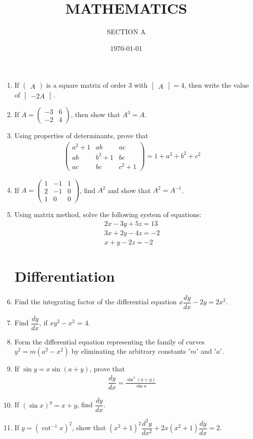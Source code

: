 \documentclass[10pt,-letter paper]{article}
\title{MATHEMATICS}
\author{SECTION A}
\date{\today}
\providecommand{\brak}[1]{\ensuremath{\left(#1\right)}}
\newcommand{\myvec}[1]{\ensuremath{\begin{pmatrix}#1\end{pmatrix}}}
\newcommand{\mydet}[1]{\ensuremath{\begin{vmatrix}#1\end{vmatrix}}}
\begin{document}
\maketitle

\begin{enumerate}
\section{Matrix}
\item If \myvec{A} is a square matrix of order $3$ with $\mydet{A} = 4$, then write the value of $\mydet{-2A}$.
\item If $A=\myvec{ -3 & 6 \\ -2 & 4}$, then show that ${A}^3=A$.
\item Using properties of determinants, prove that
	\begin{align*}
\myvec{{a}^2 + {1} & {a}{b} & {a}{c} \\ {a}{b} & {b}^2+{1} & {b}{c} \\ {a}{c} & {b}{c} & {c}^2+{1}} = 1+{a}^2+{b}^2+{c}^2
	\end{align*}
\item If $A=\myvec{1&-1&1 \\ 2&-1&0 \\ 1&0&0}$, find ${A}^2$ and show that ${A}^2 = A^{-1}$.
\item Using matrix method, solve the following system of equations:
	\begin{align*}
		2{x}-3{y}+5{z}=13 \\
		3{x}+2{y}-4{z}=-2 \\
		{x}+{y}-2{z}=-2
	\end{align*}
\section{Differentiation}
\item Find the integrating factor of the differential equation ${x}\dfrac{dy}{dx}-2{y} = 2{x}^2$.
\item Find $\dfrac{dy}{dx}$, if ${x}{y}^2-{x}^2$ = $4$.
\item Form the differential equation representing the family of curves ${y}^2 = m\brak{{a}^2-{x}^2}$ by eliminating the arbitrary constants $'m'$ and $'a'$.
\item If $\sin{y} = x\sin{\brak{a + y}}$, prove that 
	\begin{align*}
		\dfrac{dy}{dx} = \frac{\sin^{2}\brak{a + y}}{\sin{a}}
	\end{align*}
\item If $\brak{\sin x}^y = {x + y}$, find $\dfrac{dy}{dx}$.
\item If $y = \brak{\cot^{-1}{x}}^2$, show that $\brak{{x}^2+{1}}^2\dfrac{d^2y}{dx^2} + 2{x}\brak{{x^2}+{1}}\dfrac{dy}{dx} = 2$.

\end{enumerate}
\end{document}
